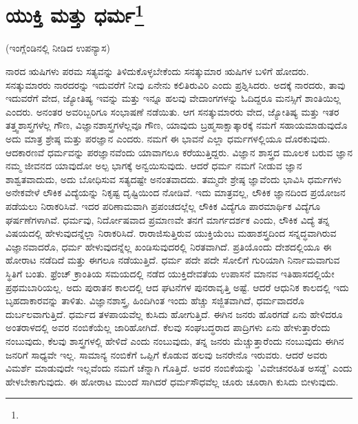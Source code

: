 
\chapter[ಯುಕ್ತಿ ಮತ್ತು ಧರ್ಮ]{ಯುಕ್ತಿ ಮತ್ತು ಧರ್ಮ\protect\footnote{}}

\begin{center}
(ಇಂಗ್ಲೆಂಡಿನಲ್ಲಿ ನೀಡಿದ ಉಪನ್ಯಾಸ)
\end{center}

ನಾರದ ಋಷಿಗಳು ಪರಮ ಸತ್ಯವನ್ನು ತಿಳಿದುಕೊಳ್ಳಬೇಕೆಂದು ಸನತ್ಕುಮಾರ ಋಷಿಗಳ ಬಳಿಗೆ ಹೋದರು. ಸನತ್ಕುಮಾರರು ನಾರದರನ್ನು ಇದುವರೆಗೆ ನೀವು ಏನೇನು ಕಲಿತಿರುವಿರಿ ಎಂದು ಪ್ರಶ್ನಿಸಿದರು. ಅದಕ್ಕೆ ನಾರದರು, ತಾವು ಇದುವರೆಗೆ ವೇದ, ಜ್ಯೋತಿಷ್ಯ ಇವನ್ನು ಮತ್ತು ಇನ್ನೂ ಹಲವು ವೇದಾಂಗಗಳನ್ನು ಓದಿದ್ದರೂ ಮನಸ್ಸಿಗೆ ಶಾಂತಿಯಿಲ್ಲ ಎಂದರು. ಅನಂತರ ಅವರಿಬ್ಬರಿಗೂ ಸಂಭಾಷಣೆ ನಡೆಯಿತು. ಆಗ ಸನತ್ಕುಮಾರರು ವೇದ, ಜ್ಯೋತಿಷ್ಯ ಮತ್ತು ಇತರ ತತ್ತ್ವಶಾಸ್ತ್ರಗಳೆಲ್ಲ ಗೌಣ, ವಿಜ್ಞಾನಶಾಸ್ತ್ರಗಳೆಲ್ಲವೂ ಗೌಣ, ಯಾವುದು ಬ್ರಹ್ಮಸಾಕ್ಷಾತ್ಕಾರಕ್ಕೆ ನಮಗೆ ಸಹಾಯಮಾಡುವುದೊ ಅದು ಮಾತ್ರ ಶ್ರೇಷ್ಠ ಮತ್ತು ಪರಜ್ಞಾನ ಎಂದರು. ನಮಗೆ ಈ ಭಾವನೆ ಎಲ್ಲಾ ಧರ್ಮಗಳಲ್ಲಿಯೂ ದೊರಕುವುದು. ಆದಕಾರಣವೆ ಧರ್ಮವನ್ನು ಪರಜ್ಞಾನವೆಂದು ಯಾವಾಗಲೂ ಕರೆಯುತ್ತಿದ್ದರು. ವಿಜ್ಞಾನ ಶಾಸ್ತ್ರದ ಮೂಲಕ ಬರುವ ಜ್ಞಾನ ನಮ್ಮ ಜೀವನದ ಯಾವುದೋ ಅಲ್ಪ ಭಾಗಕ್ಕೆ ಅನ್ವಯಿಸುವುದು. ಆದರೆ ಧರ್ಮ ನಮಗೆ ನೀಡುವ ಜ್ಞಾನ ಶಾಶ್ವತವಾದುದು, ಅದು ಬೋಧಿಸುವ ಸತ್ಯದಷ್ಟೇ ಅನಂತವಾದದು. ತಮ್ಮದೇ ಶ್ರೇಷ್ಠ ಜ್ಞಾವೆಂದು ಭಾವಿಸಿ ಧರ್ಮಗಳು ಅನೇಕವೇಳೆ ಲೌಕಿಕ ವಿದ್ಯೆಯನ್ನು ನಿಕೃಷ್ಟ ದೃಷ್ಟಿಯಿಂದ ನೋಡಿವೆ. ಇದು ಮಾತ್ರವಲ್ಲ, ಲೌಕಿಕ ಜ್ಞಾನದಿಂದ ಪ್ರಯೋಜನ ಪಡೆಯಲು ನಿರಾಕರಿಸಿವೆ. ಇದರ ಪರಿಣಾಮವಾಗಿ ಪ್ರಪಂಚದಲ್ಲೆಲ್ಲ ಲೌಕಿಕ ವಿದ್ಯೆಗೂ ಪಾರಮಾರ್ಥಿಕ ವಿದ್ಯೆಗೂ ಘರ್ಷಣೆಗಳಾಗಿವೆ. ಧರ್ಮವು, ನಿರ್ದೋಷವಾದ ಪ್ರಮಾಣವೇ ತನಗೆ ಮಾರ್ಗದರ್ಶಕ ಎಂದು, ಲೌಕಿಕ ವಿದ್ಯೆ ತನ್ನ ವಿಷಯದಲ್ಲಿ ಹೇಳುವುದನ್ನೆಲ್ಲಾ ನಿರಾಕರಿಸಿದೆ. ರಾರಾಜಿಸುತ್ತಿರುವ ಯುಕ್ತಿಯೆಂಬ ಮಹಾಶಸ್ತ್ರದಿಂದ ಸನ್ನದ್ಧವಾಗಿರುವ ವಿಜ್ಞಾನವಾದರೊ, ಧರ್ಮ ಹೇಳುವುದನ್ನೆಲ್ಲ ಖಂಡಿಸುವುದರಲ್ಲಿ ನಿರತವಾಗಿದೆ. ಪ್ರತಿಯೊಂದು ದೇಶದಲ್ಲಿಯೂ ಈ ಹೋರಾಟ ನಡೆದಿದೆ ಮತ್ತು ಈಗಲೂ ನಡೆಯುತ್ತಿದೆ. ಧರ್ಮ ಪದೇ ಪದೇ ಸೋಲಿಗೆ ಗುರಿಯಾಗಿ ನಿರ್ನಾಮವಾಗುವ ಸ್ಥಿತಿಗೆ ಬಂತು. ಫ್ರೆಂಚ್ ಕ್ರಾಂತಿಯ ಸಮಯದಲ್ಲಿ ನಡೆದ ಯುಕ್ತಿದೇವತೆಯ ಉಪಾಸನೆ ಮಾನವ ಇತಿಹಾಸದಲ್ಲಿಯೇ ಪ್ರಥಮಬಾರಿಯಲ್ಲ. ಅದು ಪುರಾತನ ಕಾಲದಲ್ಲಿ ಆದ ಘಟನೆಗಳ ಪುನರಾವೃತ್ತಿ ಅಷ್ಟೆ. ಆದರೆ ಆಧುನಿಕ ಕಾಲದಲ್ಲಿ ಇದು ಬೃಹದಾಕಾರವನ್ನು ತಾಳಿತು. ವಿಜ್ಞಾನಶಾಸ್ತ್ರ, ಹಿಂದಿಗಿಂತ ಇಂದು ಹೆಚ್ಚು ಸಜ್ಜಿತವಾಗಿದೆ, ಧರ್ಮವಾದರೊ ದುರ್ಬಲವಾಗುತ್ತಿದೆ. ಧರ್ಮದ ತಳಪಾಯವೆಲ್ಲ ಕುಸಿದು ಹೋಗುತ್ತಿದೆ. ಈಗಿನ ಜನರು ಹೊರಗಡೆ ಏನು ಹೇಳಿದರೂ ಅಂತರಾಳದಲ್ಲಿ ಅವರ ನಂಬಿಕೆಯೆಲ್ಲ ಜಾರಿಹೋಗಿದೆ. ಕೆಲವು ಸಂಘಬದ್ಧರಾದ ಪಾದ್ರಿಗಳು ಏನು ಹೇಳುತ್ತಾರೆಂದು ನಂಬುವುದು, ಕೆಲವು ಶಾಸ್ತ್ರಗಳಲ್ಲಿ ಹೇಳಿದೆ ಎಂದು ನಂಬುವುದು, ತನ್ನ ಜನರು ಮೆಚ್ಚುತ್ತಾರೆಂದು ನಂಬುವುದು ಈಗಿನ ಜನರಿಗೆ ಸಾಧ್ಯವೇ ಇಲ್ಲ. ಸಾಮಾನ್ಯ ನಂಬಿಕೆಗೆ ಒಪ್ಪಿಗೆ ಕೊಡುವ ಹಲವು ಜನರೇನೊ ಇರುವರು. ಆದರೆ ಅವರು ವಿಮರ್ಶೆ ಮಾಡುವುದೇ ಇಲ್ಲವೆಂದು ನಮಗೆ ಚೆನ್ನಾಗಿ ಗೊತ್ತಿದೆ. ಅವರ ನಂಬಿಕೆಯನ್ನು 'ವಿವೇಚನರಹಿತ ಅಸಡ್ಡೆ' ಎಂದು ಹೇಳಬೇಕಾಗುವುದು. ಈ ಹೋರಾಟ ಮುಂದೆ ಸಾಗಿದರೆ ಧರ್ಮಸೌಧವೆಲ್ಲ ಚೂರು ಚೂರಾಗಿ ಕುಸಿದು ಬೀಳುವುದು.

